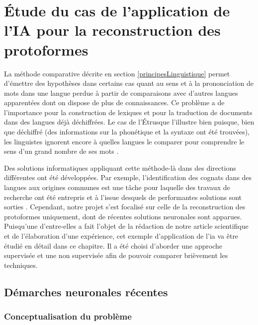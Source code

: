 \documentclass[12pt, twoside]{report}
\begin{document}
\chapter{Étude du cas de l'application de l'IA pour la reconstruction des protoformes}
La méthode comparative décrite en section \ref{principesLinguistique} permet d'émettre des hypothèses dans certains cas quant au sens et à la prononciation de mots dans une langue perdue à partir de comparaisons avec d'autres langues apparentées dont on dispose de plus de connaissances. Ce problème a de l'importance pour la construction de lexiques et pour la traduction de documents dans des langues déjà déchiffrées. Le cas de l'Étrusque l'illustre bien puisque, bien que déchiffré (des informations sur la phonétique et la syntaxe ont été trouvées), les linguistes ignorent encore à quelles langues le comparer pour comprendre le sens d'un grand nombre de ses mots \parencite{bnf_etrusque}.

Des solutions informatiques appliquant cette méthode-là dans des directions différentes ont été développées. Par exemple, l'identification des \glspl{cognat} dans des langues aux origines communes est une tâche pour laquelle des travaux de recherche ont été entrepris et à l'issue desquels de performantes solutions sont sorties \autocite{fourrier}\autocite[2: Related Works]{meloni-etal-2021-ab}. Cependant, notre projet s'est focalisé sur celle de la reconstruction des \glspl{protoforme} uniquement, dont de récentes solutions neuronales sont apparues. Puisqu'une d'entre-elles a fait l'objet de la rédaction de notre article scientifique et de l'élaboration d'une expérience, cet exemple d'application de l'\Gls{ia} va être étudié en détail dans ce chapitre. Il a été choisi d'aborder une approche supervisée et une non supervisée afin de pouvoir comparer brièvement les techniques.
\section{Démarches neuronales récentes}
\subsection{Conceptualisation du problème}
\end{document}
